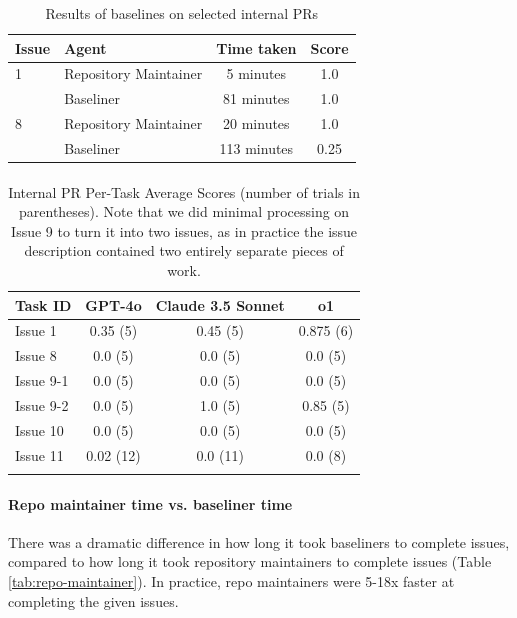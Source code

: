 \documentclass{article}
\begin{document}
\begin{table}
    \centering
    \begin{tabular}{llcc}
    \textbf{Issue} & \textbf{Agent} & \textbf{Time taken} & \textbf{Score} \\
\hline
       1 & Repository Maintainer  & 5 minutes & 1.0 \\
       & Baseliner  & 81 minutes & 1.0 \\
       \hline
        8 & Repository Maintainer  & 20 minutes & 1.0 \\
       & Baseliner  & 113 minutes & 0.25 \\
    \end{tabular}
    \caption{Results of baselines on selected internal PRs}
    \label{tab:internal_pr}
\end{table}


 \paragraph{} 
 \begin{table}[ht]
\centering
\begin{tabular}{lccc}
\hline
\textbf{Task ID} & \textbf{GPT-4o} & \textbf{Claude 3.5 Sonnet} & \textbf{o1} \\
\hline
Issue 1 & 0.35 (5) & 0.45 (5) & 0.875 (6) \\
Issue 8 & 0.0 (5) & 0.0 (5) & 0.0 (5) \\
Issue 9-1 & 0.0 (5) & 0.0 (5) & 0.0 (5) \\
Issue 9-2 & 0.0 (5) & 1.0 (5) & 0.85 (5) \\
Issue 10 & 0.0 (5) & 0.0 (5) & 0.0 (5) \\
Issue 11 & 0.02 (12) & 0.0 (11) & 0.0 (8) \\
\hline\\
\end{tabular}
\caption{Internal PR Per-Task Average Scores (number of trials in parentheses). Note that we did minimal processing on Issue 9 to turn it into two issues, as in practice the issue description contained two entirely separate pieces of work.}
\end{table}
 \paragraph{Repo maintainer time vs. baseliner time} 
There was a dramatic difference in how long it took baseliners to complete issues, compared to how long it took repository maintainers to complete issues (Table \ref{tab:repo-maintainer}). In practice, repo maintainers were 5-18x faster at completing the given issues.
\end{document}

